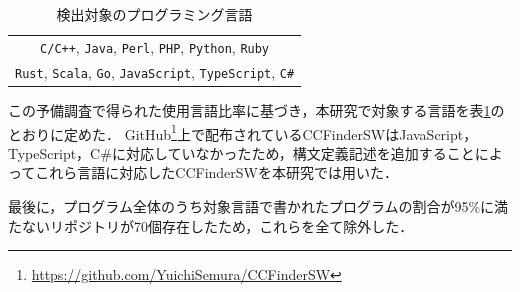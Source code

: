 \documentclass[T,J]{fose}
\begin{document}
\begin{table}[tb]
    \centering
    \caption{検出対象のプログラミング言語}
    \label{table:detectLanguages}
    \begin{tabular}{c}
        \hline
        \verb|C/C++|, \verb|Java|, \verb|Perl|, \verb|PHP|, \verb|Python|, \verb|Ruby| \\
        \verb|Rust|, \verb|Scala|, \verb|Go|, \verb|JavaScript|, \verb|TypeScript|, \verb|C#| \\
        \hline
    \end{tabular}
\end{table}

この予備調査で得られた使用言語比率に基づき，本研究で対象する言語を表\ref{table:detectLanguages}のとおりに定めた．
GitHub\footnote{\url{https://github.com/YuichiSemura/CCFinderSW}}上で配布されているCCFinderSWはJavaScript，TypeScript，C\#に対応していなかったため，構文定義記述を追加することによってこれら言語に対応したCCFinderSWを本研究では用いた．


最後に，プログラム全体のうち対象言語で書かれたプログラムの割合が95\%に満たないリポジトリが70個存在したため，これらを全て除外した．
\end{document}
